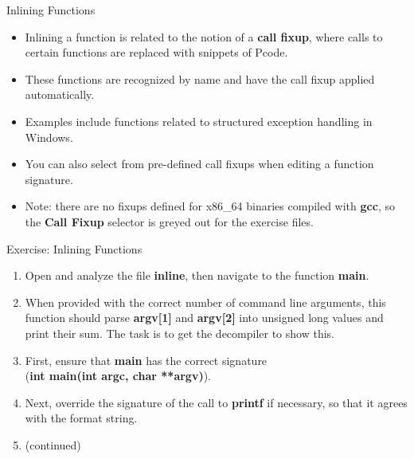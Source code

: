 \documentclass{beamer}
\begin{document}
\begin{frame}
\begin{block}{Inlining Functions}
\begin{itemize}
\item Inlining a function is related to the notion of a \textbf{call fixup}, where calls to certain functions are replaced with snippets of Pcode.
\item These functions are recognized by name and have the call fixup applied automatically.
\item Examples include functions related to structured exception handling in Windows.
\item You can also select from pre-defined call fixups when editing a function signature.
\item Note: there are no fixups defined for x86\_64 binaries compiled with \textbf{gcc}, so the \textbf{Call Fixup} selector is greyed out for the exercise files.
\end{itemize}
\end{block}
\end{frame}

\begin{frame}
\begin{block}{Exercise: Inlining Functions}
\begin{enumerate}
\item Open and analyze the file \textbf{inline}, then navigate to the function \textbf{main}.
\item When provided with the correct number of command line arguments, this function should parse \textbf{argv[1]} and \textbf{argv[2]} into unsigned long values and print their sum.
The task is to get the decompiler to show this.
\item First, ensure that \textbf{main} has the correct signature \\ (\textbf{int main(int argc, char **argv)}).
\item Next, override the signature of the call to \textbf{printf} if necessary, so that it agrees with the format string.
\item[] (continued)
\end{enumerate}
\end{block}
\end{frame}
\end{document}

